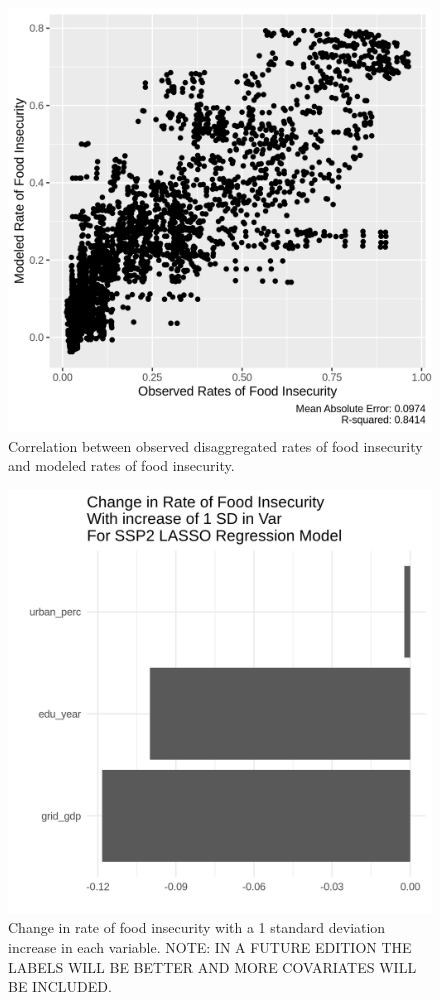 \documentclass{article}
\begin{document}
\begin{figure}[H]
	\centering
	\includegraphics[width=0.6\linewidth]{../figures/SSP2_Residuals.png}
	\caption{Correlation between observed disaggregated rates of food insecurity and modeled rates of food insecurity.}
	\label{fig:ssp_residuals}
\end{figure}
\begin{figure}[H]
	\centering
	\includegraphics[width=0.6\linewidth]{../figures/SSP2_Coefs.png}
	\caption{Change in rate of food insecurity with a 1 standard deviation increase in each variable.  NOTE: IN A FUTURE EDITION THE LABELS WILL BE BETTER AND MORE COVARIATES WILL BE INCLUDED.}
	\label{fig:ssp_coefs}
\end{figure}
\end{document}

